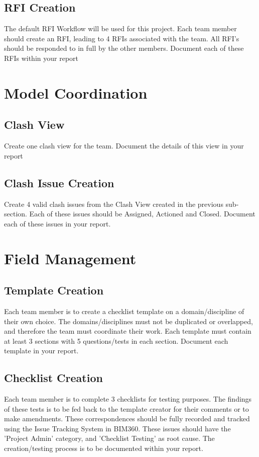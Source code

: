 \subsection{RFI Creation}
The default RFI Workflow will be used for this project.  Each team member should create an RFI, leading to 4 RFIs associated with the team.  All RFI's should be responded to in full by the other members.  Document each of these RFIs within your report 


\section{Model Coordination}
\subsection{Clash View}
Create one clash view for the team.  Document the details of this view in your report
\subsection{Clash Issue Creation}
Create 4 valid clash issues from the Clash View created in the previous sub-section.  Each of these issues should be Assigned, Actioned and Closed.  Document each of these issues in your report.


\section{Field Management}
\subsection{Template Creation}

Each team member is to create a checklist template on a domain/discipline of their own choice.  The domains/disciplines must not be duplicated or overlapped, and therefore the team must coordinate their work.  Each template must contain at least 3 sections with 5 questions/tests in each section.  Document each template in your report.

\subsection{Checklist Creation}

Each team member is to complete 3 checklists for testing purposes.  The findings of these tests is to be fed back to the template creator for their comments or to make amendments.  These correspondences should be fully recorded and tracked using the Issue Tracking System in BIM360. These issues should have the 'Project Admin' category, and 'Checklist Testing' as root cause.  The creation/testing process is to be documented within your report.  



